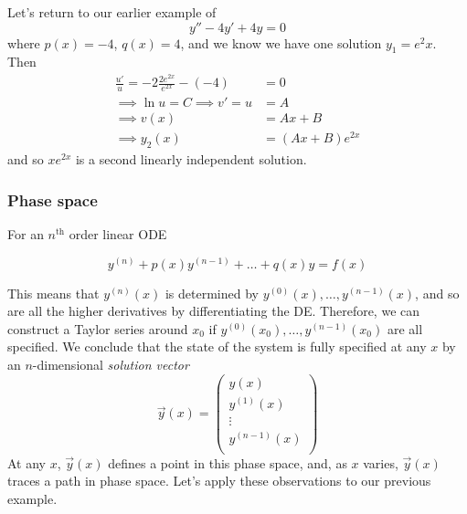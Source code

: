 \documentclass{../template/note}
\begin{document}
    \begin{example}
        Let's return to our earlier example of
        \[
            y'' - 4y' + 4y = 0
        \]
        where \(p(x) = -4\), \(q(x) = 4\), and we know we have one solution \(y_1 = e^2x\). Then
        \begin{align*}
            \frac{u'}{u} = -2\frac{2e^{2x}}{e^{2x}} - (-4) &= 0 \\
            \implies \ln u = C \implies v' = u &= A \\
            \implies v(x) &= Ax + B \\
            \implies y_2(x) &= (Ax + B)e^{2x}
        \end{align*}
        and so \(xe^{2x}\) is a second linearly independent solution.
        
    \end{example}
    
    \subsubsection{Phase space}

    For an \(n^\text{th}\) order linear ODE

    \[
        y^{(n)} + p(x)y^{(n-1)} + \dots + q(x)y = f(x)
    \]

    This means that \(y^{(n)}(x)\) is determined by \(y^{(0)}(x), \dots, y^{(n-1)}(x)\), and so are all the higher derivatives by differentiating the DE. Therefore, we can construct a Taylor series around \(x_0\) if \(y^{(0)}(x_0), \dots, y^{(n-1)}(x_0)\) are all specified. We conclude that the state of the system is fully specified at any \(x\) by an \(n\)-dimensional \emph{solution vector}
    \[
        \vec y(x) = \begin{pmatrix}
         y(x) \\
         y^{(1)}(x) \\
         \vdots \\
         y^{(n-1)}(x) \\
        \end{pmatrix}
    \]
    At any \(x\), \(\vec y(x)\) defines a point in this phase space, and, as \(x\) varies, \(\vec y(x)\) traces a path in phase space. Let's apply these observations to our previous example.
\end{document}
